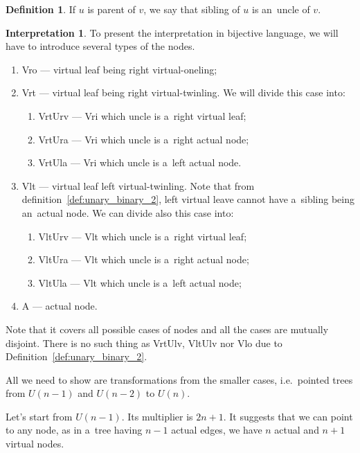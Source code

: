 \documentclass[final]{article}
\theoremstyle{definition}
\newtheorem{definition}{Definition}[subsection]
\theoremstyle{definition}
\newtheorem{interpretation}{Interpretation}[subsection]
\theoremstyle{remark}
\begin{document}
\begin{definition}
    If \(u\) is parent of \(v\), we say that sibling of \(u\) is an~uncle of \(v\).
\end{definition}

\begin{interpretation}
To present the interpretation in bijective language, we will have to introduce several types of the nodes.

\begin{enumerate}
    \item Vro --- virtual leaf being right virtual-oneling;
    \item Vrt --- virtual leaf being right virtual-twinling. We will divide this case into:
        \begin{enumerate}
            \item VrtUrv --- Vri which uncle is a~right virtual leaf;
            \item VrtUra --- Vri which uncle is a~right actual node;
            \item VrtUla --- Vri which uncle is a~left actual node.
        \end{enumerate}
    \item Vlt --- virtual leaf left virtual-twinling. Note that from definition~\ref{def:unary_binary_2}, left virtual leave cannot have a~sibling being an~actual node. We can divide also this case into:
        \begin{enumerate}
            \item VltUrv --- Vlt which uncle is a~right virtual leaf;
            \item VltUra --- Vlt which uncle is a~right actual node;
            \item VltUla --- Vlt which uncle is a~left actual node;
        \end{enumerate}
    \item A --- actual node.
\end{enumerate}

Note that it covers all possible cases of nodes and all the cases are mutually disjoint. There is no such thing as VrtUlv, VltUlv nor Vlo due to Definition~\ref{def:unary_binary_2}.

All we need to show are transformations from the smaller cases, i.e.~pointed trees from \(U(n-1)\) and \(U(n-2)\) to \(U(n)\).

Let's start from \(U(n-1)\). Its multiplier is \(2n + 1\). It suggests that we can point to any node, as in a~tree having \(n - 1\) actual edges, we have \(n\) actual and \(n + 1\) virtual nodes.


\end{interpretation}
\end{document}
